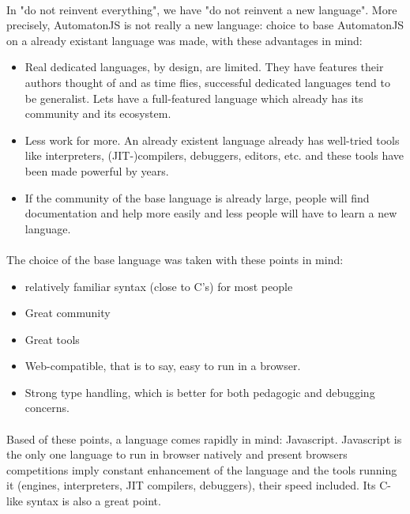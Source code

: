 \documentclass{article}
\begin{document}
\begin{sloppypar}
\paragraph{}
In "do not reinvent everything", we have "do not reinvent a new language". More precisely, AutomatonJS is not really a new language: choice to base AutomatonJS on a already existant language was made, with these advantages in mind:
    
\begin{itemize}
	\item{ Real dedicated languages, by design, are limited. They have features their authors thought of and as time flies, successful dedicated languages tend to be generalist. Lets have a full-featured language which already has its community and its ecosystem.}
	\item{ Less work for more. An already existent language already has well-tried tools like interpreters, (JIT-)compilers, debuggers, editors, etc. and these tools have been made powerful by years.}
	\item{ If the community of the base language is already large, people will find documentation and help more easily and less people will have to learn a new language.}
\end{itemize}

\paragraph{}
The choice of the base language was taken with these points in mind:
    
\begin{itemize}
	\item{ relatively familiar syntax (close to C's) for most people}
	\item{ Great community}
	\item{ Great tools}
	\item{ Web-compatible, that is to say, easy to run in a browser.}
	\item{ Strong type handling, which is better for both pedagogic and debugging concerns.}
\end{itemize}

\paragraph{}
Based of these points, a language comes rapidly in mind: Javascript. Javascript is the only one language to run in browser natively and present browsers competitions imply constant enhancement of the language and the tools running it (engines, interpreters, JIT compilers, debuggers), their speed included. Its C-like syntax is also a great point.


\end{sloppypar}
\end{document}
